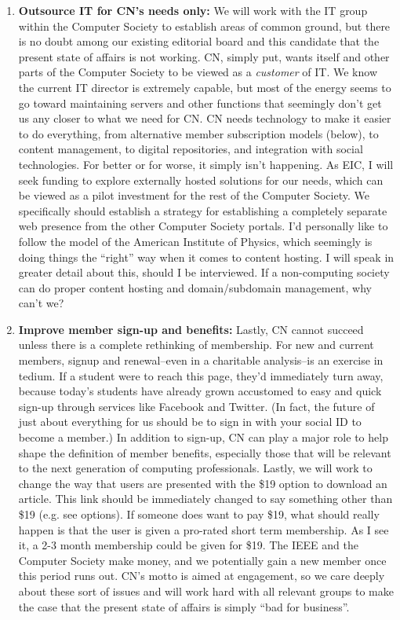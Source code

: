 \documentclass[11pt,english]{luclet}
\begin{document}
\begin{enumerate}
\item \textbf{Outsource IT for CN's needs only:} We will work with the IT group
  within the Computer Society to establish areas of common ground, but
  there is no doubt among our existing editorial board and this
  candidate that the present state of affairs is not working. CN,
  simply put, wants itself and other parts of the Computer Society to
  be viewed as a \emph{customer} of IT. We know the current IT director is
  extremely capable, but most of the energy seems to go toward
  maintaining servers and other functions that seemingly don't get us
  any closer to what we need for CN. CN needs technology to make it
  easier to do everything, from alternative member subscription models
  (below), to content management, to digital repositories, and
  integration with social technologies. For better or for worse, it
  simply isn't happening. As EIC, I will seek funding to explore
  externally hosted solutions for our needs, which can be viewed as a
  pilot investment for the rest of the Computer Society. We
  specifically should establish a strategy for establishing a completely
  separate web presence from the other Computer Society portals. I'd
  personally like to follow the model of the American Institute of
  Physics, which seemingly is doing things the ``right'' way when it
  comes to content hosting. I will speak in greater detail about this,
  should I be interviewed. If a non-computing society can do proper
  content hosting and domain/subdomain management, why can't we?

\item  \textbf{Improve member sign-up and benefits:} Lastly, CN cannot succeed
  unless there is a complete rethinking of membership. For new and
  current members, signup and renewal--even in a charitable
  analysis--is an exercise in tedium. If a student were to reach this
  page, they'd immediately turn away, because today's students have
  already grown accustomed to easy and quick sign-up through services
  like Facebook and Twitter. (In fact, the future of just about
  everything for us should be to sign in with your social ID to become
  a member.) In addition to sign-up, CN can play a major role to help
  shape the definition of member benefits, especially those that will
  be relevant to the next generation of computing professionals.
  Lastly, we will work to change the way that users are presented with
  the \$19 option to download an article. This link should be
  immediately changed to say something other than \$19 (e.g. see
  options). If someone does want to pay \$19, what should really
  happen is that the user is given a pro-rated short term
  membership. As I see it, a 2-3 month membership could be given for
  \$19. The IEEE and the Computer Society make money, and we
  potentially gain a new member once this period runs out. CN's motto
  is aimed at engagement, so we care deeply about these sort of issues
  and will work hard with all relevant groups to make the case that
  the present state of affairs is simply ``bad for business''.


\end{enumerate}
\end{document}
